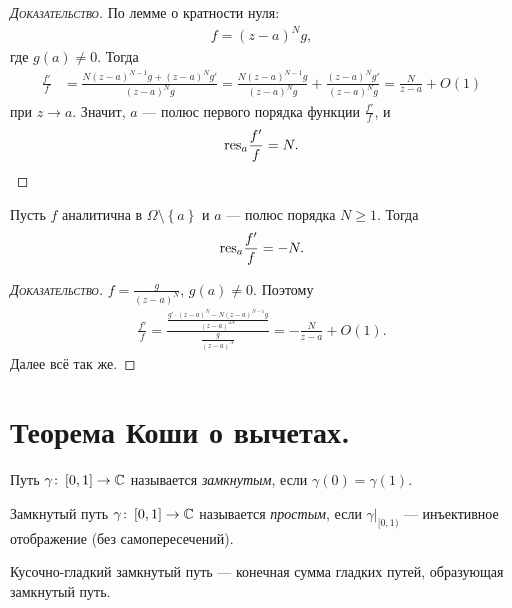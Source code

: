 \documentclass[../complex-analysis.tex]{subfiles}
\begin{document}
\begin{proof}[\normalfont\textsc{Доказательство}]
 По лемме о кратности нуля:
 \begin{align*}
  f=(z-a)^{N}g,
 \end{align*} где $ g(a) \neq 0 $. Тогда
 \begin{align*}
  \frac{f'}{f} &= \frac{N(z-a)^{N-1}g + (z-a)^{N}g'}{(z-a)^{N}g} = \frac{N (z-a)^{N - 1} g}{(z - a)^{N} g} + \frac{(z-a)^{N} g'}{(z-a)^{N} g}= \frac{N}{z-a} + O(1)
 \end{align*} при $ z \to a $. Значит, $ a $  --- полюс первого порядка функции $ \frac{f'}{f} $, и
 \begin{align*}
  \mathrm{res}_a \frac{f'}{f} = N.
 \end{align*}
\end{proof}

\begin{exmpl}
 \label{example:logarithmic_derivative2}
 Пусть $ f $ аналитична в $ \Omega \setminus \left\{ a \right\} $ и $ a $ --- полюс порядка $ N \geqslant 1$. Тогда
 \begin{align*}
  \mathrm{res}_a \frac{f'}{f} = -N.
 \end{align*}
\end{exmpl}
\begin{proof}[\normalfont\textsc{Доказательство}]
 $ f = \frac{g}{(z-a)^{N}} $, $ g(a) \neq 0 $. Поэтому
 \begin{align*}
  \frac{f'}{f} = \frac{ \frac{g' \cdot (z-a)^{N} - N(z-a)^{N-1}g}{(z-a)^{2N}} }{\frac{g}{(z-a)^{N}}} = -\frac{N}{z-a} + O(1).
 \end{align*} Далее всё так же.
\end{proof}

\newpage
\section{Теорема Коши о вычетах.}

\begin{df*}
 Путь $ \gamma \colon\,[0,1] \to \mathbb{C} $ называется \textit{замкнутым}, если $ \gamma(0) = \gamma(1) $.
\end{df*}

\begin{df*}
 Замкнутый путь $ \gamma\colon\,[0,1] \to \mathbb{C} $ называется \textit{простым}, если $\gamma |_{[0, 1)}$ --- инъективное отображение (без самопересечений).
\end{df*}

\begin{df*}
 Кусочно-гладкий замкнутый путь --- конечная сумма гладких путей, образующая замкнутый путь.
\end{df*}
\end{document}
